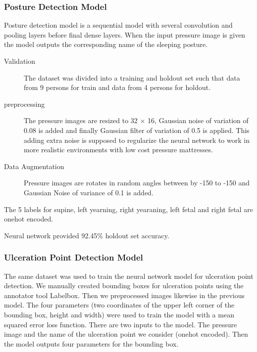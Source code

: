 \subsubsection{Posture Detection Model}

Posture detection model is a sequential model with several convolution and pooling layers before final dense layers. When the input pressure image is given the model outputs the corresponding name of the sleeping posture.


\begin{description}
	\item[Validation] The dataset was divided into a training and holdout set such that data from 9 persons for train and data from 4 persons for holdout.
	\item[preprocessing] The pressure images are resized to 32 $\times$ 16, Gaussian noise of variation of 0.08 is added and finally Gaussian filter of variation of 0.5 is applied. This adding extra noise is supposed to regularize the neural network to work in more realistic environments with low cost pressure mattresses.
	\item[Data Augmentation]  Pressure images are rotates in random angles between by -150 to -150 and Gaussian Noise of variance of 0.1 is added.	
\end{description}

The 5 labels for supine, left yearning, right yearaning, left fetal and right fetal are onehot encoded. 

Neural network provided 92.45\% holdout set accuracy.


\subsubsection{Ulceration Point Detection Model}

The same dataset was used to train the neural network model for ulceration point detection. We manually created bounding boxes for ulceration points using the annotator tool Labelbox\textsuperscript{\textregistered}. Then we preprocessed images likewise in the previous model.  The four parameters (two coordinates of the upper left corner of the bounding box, height and width) were used to train the model with a mean squared error loss function. There are two inputs to the model. The pressure image and the name of the ulceration point we consider (onehot encoded). Then the model outputs four parameters for the bounding box. 


